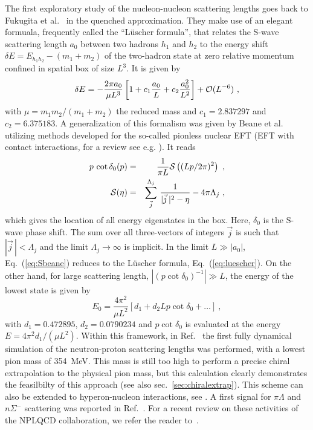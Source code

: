 \documentclass[aps,rmp,nofootinbib,twocolumn,floatfix]{revtex4}
\newcommand{\beq}{\begin{equation}}
\newcommand{\eeq}{\end{equation}}
\newcommand{\beqa}{\begin{eqnarray}}
\newcommand{\eeqa}{\end{eqnarray}}
\begin{document}
The first exploratory study of the nucleon-nucleon scattering lengths
goes back to Fukugita et al.~\cite{Fukugita:1994na,Fukugita:1994ve}
in the quenched approximation. They make use of an elegant formuala,
frequently called the ``L\"uscher formula'',
that relates the S-wave scattering length $a_0$ between two hadrons $h_1$
and $h_2$ to the energy shift $\delta E = E_{h_1h_2} - (m_1+m_2)$ of the
two-hadron state at zero relative momentum  confined in spatial box of
size $L^3$. It is given by \cite{Hamber:1983vu,Luscher:1986pf,Luscher:1990ux}
\beq\label{eq:luescher}
\delta E = -\frac{2\pi a_0}{\mu L^3} \left[ 1 + c_1 \frac{a_0}{L}
 + c_2 \frac{a_0^2}{L^2}\right] + {\cal O}(L^{-6})~,
\eeq
with $\mu = m_1 m_2/(m_1+m_2)$ the reduced mass and 
$c_1 = 2.837297$ and $c_2 = 6.375183$.
A generalization of this formalism was given by Beane et al.\cite{Beane:2003da}
utilizing methods developed for the so-called pionless nuclear EFT (EFT
with contact interactions, for a review see e.g. \cite{Bedaque:2002mn}).
It reads
\beqa\label{eq:Sbeane}
p \, \cot\delta_0(p) &=& \frac{1}{\pi L} {\cal S}\left((Lp/2\pi)^2\right)~,
\nonumber\\
{\cal S}(\eta) &=& \sum_{\vec j}^{\Lambda_j} \, \frac{1}{|\vec j\,|^2 - \eta}
- 4\pi \Lambda_j~,
\eeqa
which gives the location of all energy eigenstates in the box. Here,
$\delta_0$ is the S-wave phase shift. The sum over
all three-vectors of integers ${\vec j}$ is such that $|{\vec j}\,| < \Lambda_j$
and the limit $\Lambda_j \to \infty$ is implicit. In the limit $L \gg |a_0|$,
Eq.~(\ref{eq:Sbeane}) reduces to the L\"uscher formula,
Eq.~(\ref{eq:luescher}). On the other hand, for large scattering length,
$|(p \cot\delta_0)^{-1} | \gg L$, the energy of the lowest state is given 
by 
\beq
E_0 = \frac{4\pi^2}{\mu L^2} \left[ d_1 + d_2 Lp\cot\delta_0+ \ldots\right] ~,
\eeq
with $d_1 = 0.472895$, $d_2 = 0.0790234$ and $p \cot\delta_0$ is evaluated at
the energy $E = 4\pi^2 d_1/(\mu L^2)$. Within this framework, in 
Ref.~\cite{Beane:2006mx} the first fully dynamical simulation of the
neutron-proton scattering lengths was performed, with a lowest pion mass of 354~MeV.
This mass is still too high to perform a precise chiral extrapolation
to the physical pion mass, but this calculation clearly demonstrates the
feasilbilty of this approach (see also sec.~\ref{sec:chiralextrap}). 
This scheme can also be extended to hyperon-nucleon interactions, 
see \cite{Beane:2003yx}. A first signal  for $\pi \Lambda$  and 
$n \Sigma^-$ scattering was reported in Ref.~\cite{Beane:2006gf}.
For a recent review on these activities of the NPLQCD collaboration, 
we refer the reader to~\cite{Beane:2008dv}.
\end{document}
